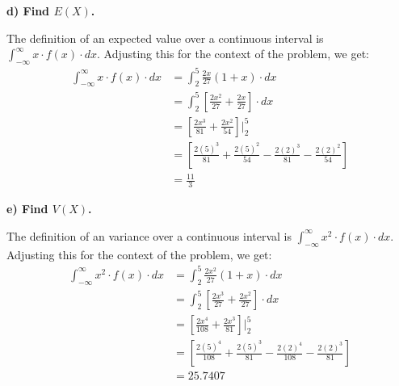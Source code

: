 \documentclass[12pt, letter]{article}
\begin{document}
\qquad \textbf{d) Find $E(X)$.}
\begin{center}
	The definition of an expected value over a continuous interval is $\int_{-\infty}^{\infty}x \cdot f(x) \cdot dx$. Adjusting this for the context of the problem, we get:
	\begin{align*}
		\int_{-\infty}^{\infty}x \cdot f(x) \cdot dx &= \int_{2}^{5} \frac{2x}{27}\left(1 + x\right) \cdot dx \\
		&= \int_{2}^{5} \left[\frac{2x^{2}}{27} + \frac{2x}{27}\right] \cdot dx \\
		&= \left[\frac{2x^{3}}{81} + \frac{2x^{2}}{54}\right] \Bigg|_{2}^{5} \\
		&= \left[\frac{2(5)^{3}}{81} + \frac{2(5)^{2}}{54} - \frac{2(2)^{3}}{81} - \frac{2(2)^{2}}{54}\right] \\
		&= \boxed{\frac{11}{3}}
	\end{align*}
\end{center}

\pagebreak

\qquad \textbf{e) Find $V(X)$.}
\begin{center}
	The definition of an variance over a continuous interval is $\int_{-\infty}^{\infty}x^{2} \cdot f(x) \cdot dx$. Adjusting this for the context of the problem, we get:
	\begin{align*}
		\int_{-\infty}^{\infty}x^{2} \cdot f(x) \cdot dx &= \int_{2}^{5} \frac{2x^{2}}{27}\left(1 + x\right) \cdot dx \\
		&= \int_{2}^{5} \left[\frac{2x^{3}}{27} + \frac{2x^{2}}{27}\right] \cdot dx \\
		&= \left[\frac{2x^{4}}{108} + \frac{2x^{3}}{81}\right] \Bigg|_{2}^{5} \\
		&= \left[\frac{2(5)^{4}}{108} + \frac{2(5)^{3}}{81} - \frac{2(2)^{4}}{108} - \frac{2(2)^{3}}{81}\right] \\
		&= \boxed{25.7407}
	\end{align*}
\end{center}
\end{document}
